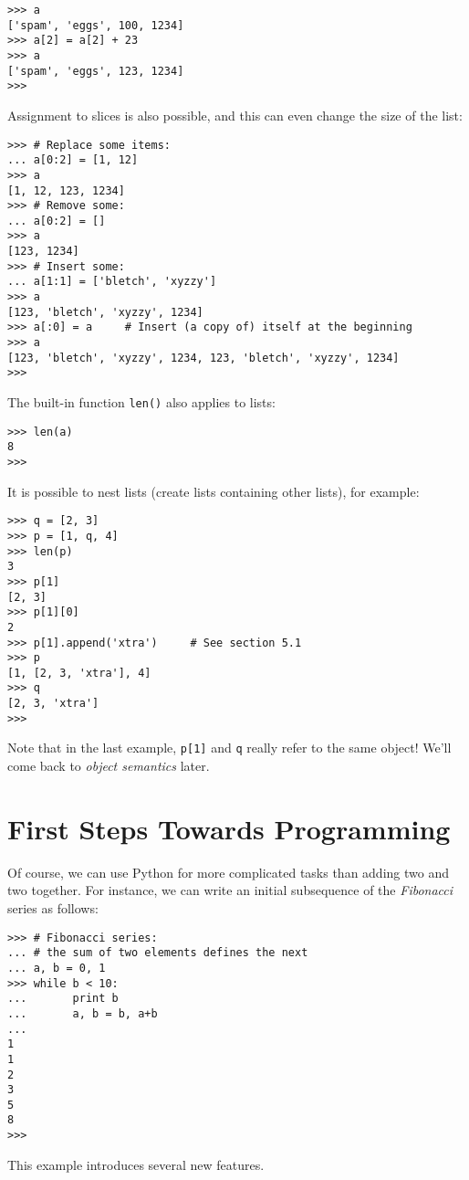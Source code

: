 \bcode\begin{verbatim}
>>> a
['spam', 'eggs', 100, 1234]
>>> a[2] = a[2] + 23
>>> a
['spam', 'eggs', 123, 1234]
>>>
\end{verbatim}\ecode
%
Assignment to slices is also possible, and this can even change the size
of the list:

\bcode\begin{verbatim}
>>> # Replace some items:
... a[0:2] = [1, 12]
>>> a
[1, 12, 123, 1234]
>>> # Remove some:
... a[0:2] = []
>>> a
[123, 1234]
>>> # Insert some:
... a[1:1] = ['bletch', 'xyzzy']
>>> a
[123, 'bletch', 'xyzzy', 1234]
>>> a[:0] = a     # Insert (a copy of) itself at the beginning
>>> a
[123, 'bletch', 'xyzzy', 1234, 123, 'bletch', 'xyzzy', 1234]
>>> 
\end{verbatim}\ecode
%
The built-in function {\tt len()} also applies to lists:

\bcode\begin{verbatim}
>>> len(a)
8
>>> 
\end{verbatim}\ecode
%
It is possible to nest lists (create lists containing other lists),
for example:

\bcode\begin{verbatim}
>>> q = [2, 3]
>>> p = [1, q, 4]
>>> len(p)
3
>>> p[1]
[2, 3]
>>> p[1][0]
2
>>> p[1].append('xtra')     # See section 5.1
>>> p
[1, [2, 3, 'xtra'], 4]
>>> q
[2, 3, 'xtra']
>>>
\end{verbatim}\ecode
%
Note that in the last example, {\tt p[1]} and {\tt q} really refer to
the same object!  We'll come back to {\em object semantics} later.

\section{First Steps Towards Programming}

Of course, we can use Python for more complicated tasks than adding
two and two together.  For instance, we can write an initial
subsequence of the {\em Fibonacci} series as follows:

\bcode\begin{verbatim}
>>> # Fibonacci series:
... # the sum of two elements defines the next
... a, b = 0, 1
>>> while b < 10:
...       print b
...       a, b = b, a+b
... 
1
1
2
3
5
8
>>> 
\end{verbatim}\ecode
%
This example introduces several new features.

